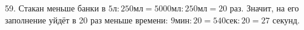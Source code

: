 59. Стакан меньше банки в $5\text{л}:250\text{мл}=5000\text{мл}:250\text{мл}=20$ раз. Значит, на его заполнение уйдёт в 20 раз меньше времени: $9\text{мин}:20=540\text{сек}:20=27$ секунд.\\
